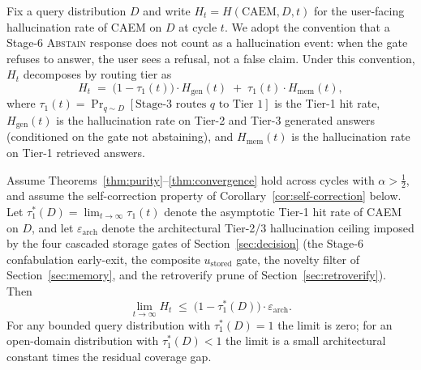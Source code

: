 Fix a query distribution $D$ and write $H_{t} = H(\text{CAEM}, D, t)$ for the user-facing hallucination rate of CAEM on $D$ at cycle $t$. We adopt the convention that a Stage-6 \textsc{Abstain} response does not count as a hallucination event: when the gate refuses to answer, the user sees a refusal, not a false claim. Under this convention, $H_{t}$ decomposes by routing tier as
\begin{equation}
H_{t} \;=\; \bigl(1 - \tau_{1}(t)\bigr) \cdot H_{\text{gen}}(t) \;+\; \tau_{1}(t) \cdot H_{\text{mem}}(t),
\label{eq:halluc-decomp}
\end{equation}
where $\tau_{1}(t) = \Pr_{q \sim D}[\text{Stage-3 routes } q \text{ to Tier~1}]$ is the Tier-1 hit rate, $H_{\text{gen}}(t)$ is the hallucination rate on Tier-2 and Tier-3 generated answers (conditioned on the gate not abstaining), and $H_{\text{mem}}(t)$ is the hallucination rate on Tier-1 retrieved answers.

\begin{theorem}
\label{thm:asymptotic-elimination}
Assume Theorems~\ref{thm:purity}--\ref{thm:convergence} hold across cycles with $\alpha > \tfrac{1}{2}$, and assume the self-correction property of Corollary~\ref{cor:self-correction} below. Let $\tau_{1}^{*}(D) = \lim_{t \to \infty} \tau_{1}(t)$ denote the asymptotic Tier-1 hit rate of CAEM on $D$, and let $\varepsilon_{\text{arch}}$ denote the architectural Tier-2/3 hallucination ceiling imposed by the four cascaded storage gates of Section~\ref{sec:decision} (the Stage-6 confabulation early-exit, the composite $u_{\text{stored}}$ gate, the novelty filter of Section~\ref{sec:memory}, and the retroverify prune of Section~\ref{sec:retroverify}). Then
\begin{equation}
\lim_{t \to \infty} H_{t} \;\leq\; \bigl(1 - \tau_{1}^{*}(D)\bigr) \cdot \varepsilon_{\text{arch}}.
\label{eq:asymptotic-elimination}
\end{equation}
For any bounded query distribution with $\tau_{1}^{*}(D) = 1$ the limit is zero; for an open-domain distribution with $\tau_{1}^{*}(D) < 1$ the limit is a small architectural constant times the residual coverage gap.
\end{theorem}

